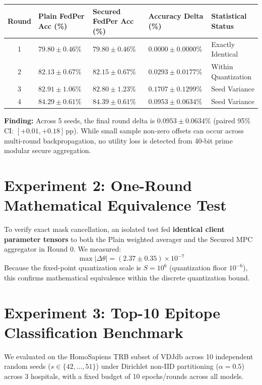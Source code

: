 \documentclass[11pt,a4paper]{report}
\begin{document}
\begin{center}
\small
\begin{longtable}{@{}c>{\centering\arraybackslash}p{3.2cm}>{\centering\arraybackslash}p{3.2cm}>{\centering\arraybackslash}p{3.0cm}>{\centering\arraybackslash}p{3.5cm}@{}}
\toprule
\textbf{Round} & \textbf{Plain FedPer Acc (\%)} & \textbf{Secured FedPer Acc (\%)} & \textbf{Accuracy Delta (\%)} & \textbf{Statistical Status} \\
\midrule
\endhead
1 & $79.80 \pm 0.46\%$ & $79.80 \pm 0.46\%$ & $0.0000 \pm 0.0000\%$ & Exactly Identical \\
2 & $82.13 \pm 0.67\%$ & $82.15 \pm 0.67\%$ & $0.0293 \pm 0.0177\%$ & Within Quantization \\
3 & $82.91 \pm 1.06\%$ & $82.80 \pm 1.23\%$ & $0.1707 \pm 0.1299\%$ & Seed Variance \\
4 & $84.29 \pm 0.61\%$ & $84.39 \pm 0.61\%$ & $0.0953 \pm 0.0634\%$ & Seed Variance \\
\bottomrule
\end{longtable}
\end{center}

\noindent\textbf{Finding:} Across 5 seeds, the final round delta is $0.0953 \pm 0.0634\%$ (paired 95\% CI: $[+0.01, +0.18]$\,pp). While small sample non-zero offsets can occur across multi-round backpropagation, no utility loss is detected from 40-bit prime modular secure aggregation.

\section{Experiment 2: One-Round Mathematical Equivalence Test}
To verify exact mask cancellation, an isolated test fed \textbf{identical client parameter tensors} to both the Plain weighted averager and the Secured MPC aggregator in Round 0. We measured:
\begin{equation}
\max |\Delta\theta| = (2.37 \pm 0.35) \times 10^{-7}
\end{equation}
Because the fixed-point quantization scale is $S = 10^6$ (quantization floor $10^{-6}$), this confirms mathematical equivalence within the discrete quantization bound.

\section{Experiment 3: Top-10 Epitope Classification Benchmark}
We evaluated on the HomoSapiens TRB subset of VDJdb across 10 independent random seeds ($s \in \{42, \dots, 51\}$) under Dirichlet non-IID partitioning ($\alpha=0.5$) across 3 hospitals, with a fixed budget of 10 epochs/rounds across all models.
\end{document}
